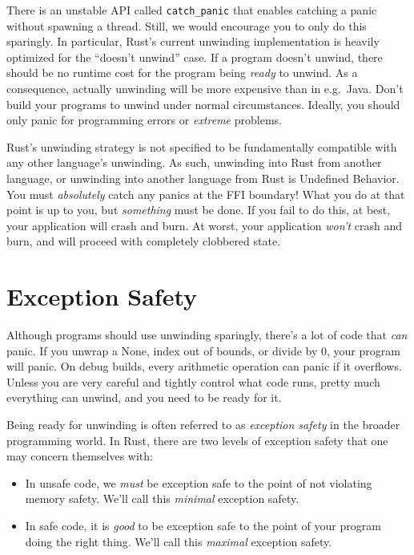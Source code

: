 \documentclass[a4paper,]{book}
\begin{document}
There is an unstable API called \texttt{catch\_panic} that enables
catching a panic without spawning a thread. Still, we would encourage
you to only do this sparingly. In particular, Rust's current unwinding
implementation is heavily optimized for the ``doesn't unwind'' case. If
a program doesn't unwind, there should be no runtime cost for the
program being \emph{ready} to unwind. As a consequence, actually
unwinding will be more expensive than in e.g.~Java. Don't build your
programs to unwind under normal circumstances. Ideally, you should only
panic for programming errors or \emph{extreme} problems.

Rust's unwinding strategy is not specified to be fundamentally
compatible with any other language's unwinding. As such, unwinding into
Rust from another language, or unwinding into another language from Rust
is Undefined Behavior. You must \emph{absolutely} catch any panics at
the FFI boundary! What you do at that point is up to you, but
\emph{something} must be done. If you fail to do this, at best, your
application will crash and burn. At worst, your application \emph{won't}
crash and burn, and will proceed with completely clobbered state.

\section{Exception Safety}\label{sec--exception-safety}

Although programs should use unwinding sparingly, there's a lot of code
that \emph{can} panic. If you unwrap a None, index out of bounds, or
divide by 0, your program will panic. On debug builds, every arithmetic
operation can panic if it overflows. Unless you are very careful and
tightly control what code runs, pretty much everything can unwind, and
you need to be ready for it.

Being ready for unwinding is often referred to as \emph{exception
safety} in the broader programming world. In Rust, there are two levels
of exception safety that one may concern themselves with:

\begin{itemize}
\item
  In unsafe code, we \emph{must} be exception safe to the point of not
  violating memory safety. We'll call this \emph{minimal} exception
  safety.
\item
  In safe code, it is \emph{good} to be exception safe to the point of
  your program doing the right thing. We'll call this \emph{maximal}
  exception safety.
\end{itemize}
\end{document}
